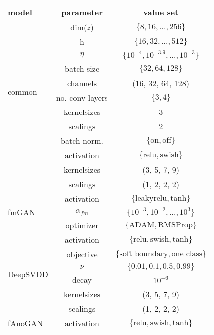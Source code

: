 \begin{tabular}{lcc}
\toprule
\textbf{model} & \textbf{parameter} &  \textbf{value set} \\
\midrule
\multirow{10}{*}{common} 
            & dim($ z $) & $\lbrace 8, 16, \ldots, 256 \rbrace$ \\
            & h & $\lbrace 16, 32, \ldots, 512\rbrace$ \\
            & $\eta$ & $\lbrace 10^{-4}, 10^{-3.9}, \ldots, 10^{-3}\rbrace$ \\
            & batch size & $\lbrace 32, 64, 128\rbrace$ \\
            & channels & (16, 32, 64, 128) \\
            & no. conv layers & $\lbrace 3, 4 \rbrace $ \\
            & kernelsizes & 3 \\
            & scalings & 2 \\
            & batch norm. & $\lbrace \text{on}, \text{off} \rbrace $ \\
            \midrule
\multirow{3}{*}{VAE} 
            & activation & $\lbrace \text{relu}, \text{swish} \rbrace$ \\
            & kernelsizes & (3, 5, 7, 9) \\
            & scalings & (1, 2, 2, 2) \\
            \midrule
\multirow{3}{*}{fmGAN}
            & activation & $\lbrace \text{leakyrelu}, \text{tanh} \rbrace$ \\
            & $\alpha_{fm}$ & $\lbrace 10^{-3}, 10^{-2}, \ldots,  10^{3} \rbrace $ \\
            & optimizer & $\lbrace \text{ADAM}, \text{RMSProp} \rbrace $ \\        
            \midrule
\multirow{6}{*}{DeepSVDD}
            & activation & $\lbrace \text{relu}, \text{swish}, \text{tanh} \rbrace$ \\
            & objective & $\lbrace \text{soft boundary}, \text{one class} \rbrace$ \\
            & $\nu$ & $ \lbrace 0.01, 0.1, 0.5, 0.99  \rbrace $ \\
            & decay & $ 10^{-6} $ \\
            & kernelsizes & (3, 5, 7, 9) \\
            & scalings & (1, 2, 2, 2) \\
            \midrule
\multirow{3}{*}{fAnoGAN}
            & activation & $\lbrace \text{relu}, \text{swish}, \text{tanh} \rbrace$ \\

\end{tabular}
